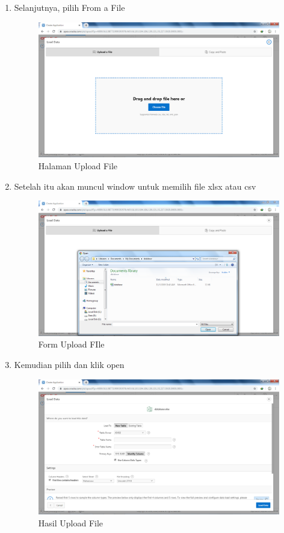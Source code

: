 \begin{enumerate}
\item Selanjutnya, pilih From a File
\begin{figure}[H]
\centering
\caption{Halaman Upload File}
\includegraphics[width=1\textwidth]{figures/3.png}
\end{figure}

\item Setelah itu akan muncul window untuk memilih file xlsx atau csv
\begin{figure}[H]
\centering
\caption{Form Upload FIle}
\includegraphics[width=1\textwidth]{figures/4.png}
\end{figure}

\item Kemudian pilih dan klik open
\begin{figure}[H]
\centering
\caption{Hasil Upload File}
\includegraphics[width=1\textwidth]{figures/5.png}
\end{figure}


\end{enumerate}
